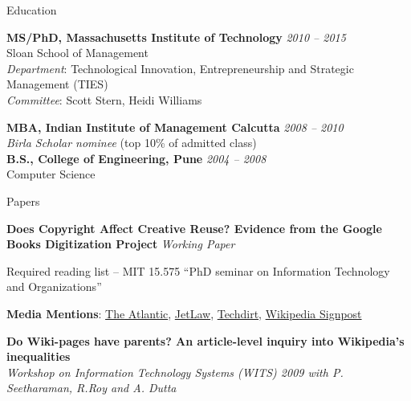 \documentclass{resume} %
\begin{document}

\begin{rSection}{Education}

{\bf MS/PhD, Massachusetts Institute of Technology} \hfill {\em 2010 -- 2015} \\ 
 Sloan School of Management  \smallskip \\
\emph{Department}: Technological Innovation, Entrepreneurship and Strategic Management (TIES) \\
\emph{Committee}: Scott Stern, Heidi Williams

{\bf MBA, Indian Institute of Management Calcutta} \hfill {\em 2008 -- 2010} \\ 
\emph{Birla Scholar nominee} (top 10\% of admitted class)  \\


{\bf B.S., College of Engineering, Pune} \hfill {\em 2004 -- 2008} \\ 
Computer Science

\end{rSection}


\begin{rSection}{Papers}

{\bf Does Copyright Affect Creative Reuse? Evidence from the Google Books Digitization Project} \emph{Working Paper}
\begin{rSubsection}{}{}{}{}
\item Required reading list -- MIT 15.575 ``PhD seminar on Information Technology and Organizations''
\item \textbf{Media Mentions}: \href{http://www.theatlantic.com/technology/archive/2012/07/mit-economist-heres-how-copyright-laws-impoverish-wikipedia/259970/}{The Atlantic}, \href{http://www.jetlaw.org/2012/07/26/copyright-law-and-wikipedia/}{JetLaw}, \href{http://www.techdirt.com/articles/20120719/04103519759/new-research-shows-how-copyright-law-is-keeping-useful-info-off-wikipedia.shtml}{Techdirt}, \href{http://en.wikipedia.org/wiki/Wikipedia:Wikipedia_Signpost/2012-07-30/Recent_research#How_Wikipedia_articles_benefit_from_the_availability_of_public_domain_resources}{Wikipedia Signpost}
\end{rSubsection}

{\bf Do Wiki-pages have parents? An article-level inquiry into Wikipedia's inequalities} \\ \emph{Workshop on Information Technology Systems (WITS) 2009 with P. Seetharaman, R.Roy and A. Dutta}

\end{rSection}
\end{document}

